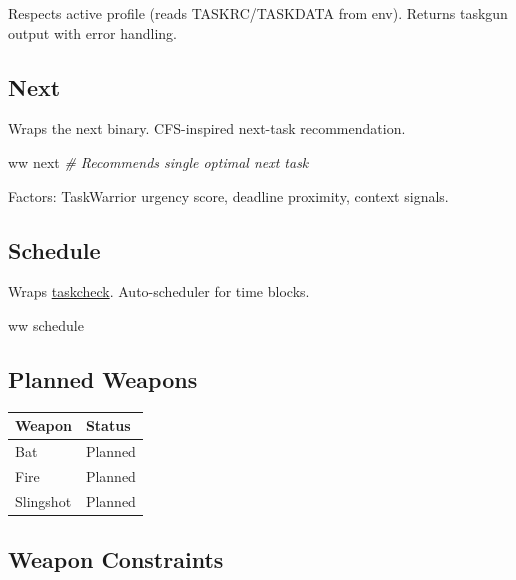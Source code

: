 \documentclass[11pt, a4paper, DIV=14]{scrartcl}
\renewcommand{\texttt}[1]{{\ttfamily\fontsize{8.5}{10.5}\selectfont\color{BabbNavy}#1}}
\newenvironment{Shaded}{%
  \vspace{4pt}%
  \begin{lrbox}{\ShadedBox}%
  \begin{minipage}{\dimexpr\linewidth-2\fboxsep\relax}%
  \vspace{4pt}%
}{%
  \vspace{4pt}%
  \end{minipage}%
  \end{lrbox}%
  \noindent\colorbox{CodeBg}{\usebox{\ShadedBox}}%
  \par\vspace{4pt}%
}
\newcommand{\CommentTok}[1]{\textcolor{BabbGray}{\textit{#1}}}
\newcommand{\ExtensionTok}[1]{#1}
\newcommand{\NormalTok}[1]{#1}
\newenvironment{Highlighting}{\ttfamily\fontsize{8.2}{11}\selectfont}{}
\newcounter{none}
\begin{document}
Respects active profile (reads TASKRC/TASKDATA from env). Returns
taskgun output with error handling.

\subsection{Next}\label{next}

Wraps the \texttt{next} binary. CFS-inspired next-task recommendation.

\begin{Shaded}
\begin{Highlighting}[]
\ExtensionTok{ww}\NormalTok{ next         }\CommentTok{\# Recommends single optimal next task}
\end{Highlighting}
\end{Shaded}

Factors: TaskWarrior urgency score, deadline proximity, context signals.

\subsection{Schedule}\label{schedule}

Wraps \href{https://github.com/taskcheck/taskcheck}{taskcheck}.
Auto-scheduler for time blocks.

\begin{Shaded}
\begin{Highlighting}[]
\ExtensionTok{ww}\NormalTok{ schedule}
\end{Highlighting}
\end{Shaded}

\subsection{Planned Weapons}\label{planned-weapons}

{\def\LTcaptype{none} %
\begin{longtable}[]{@{}ll@{}}
\toprule\noalign{}
Weapon & Status \\
\midrule\noalign{}
\endhead
\bottomrule\noalign{}
\endlastfoot
Bat & Planned \\
Fire & Planned \\
Slingshot & Planned \\
\end{longtable}
}

\subsection{Weapon Constraints}\label{weapon-constraints}
\end{document}
